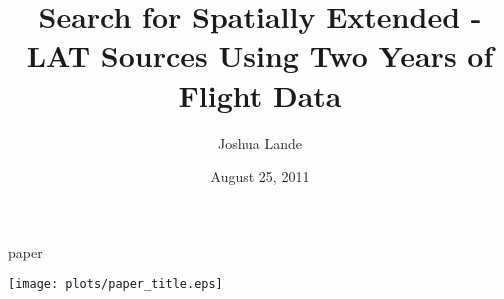 \documentclass[12pt]{beamer}
\title{Search for Spatially Extended \fermi-LAT Sources Using Two Years of Flight
Data}
\author{Joshua Lande}
\institute{SLAC/Stanford}
\date{August 25, 2011}
\begin{document}
\fermititle

\begin{frame}{paper}

  \texttt{[image: plots/paper\_title.eps]}

\end{frame}
\end{document}
